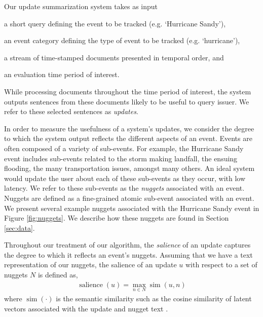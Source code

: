 \label{sec:methods}

Our update summarization system takes as input 
\begin{enumerate*}[label=\itshape\alph*\upshape)]
  \item a short query defining the event to be tracked (e.g. `Hurricane Sandy'), 
  \item an event category defining the type of event to be tracked (e.g. `hurricane'), 
  \item a stream of time-stamped documents %
  presented in temporal order, and \item an evaluation time period of interest.
\end{enumerate*} 
While processing documents
throughout the time period of interest, the system outputs sentences
from these documents likely to be useful to query issuer.  We refer
to these selected sentences as \emph{updates}.

In order to measure the usefulness of a system's updates, we consider
the degree to which the system output reflects the different
aspects of an event.  Events are often composed of a variety of sub-events.  
For example, the Hurricane Sandy
event includes sub-events related to the storm making landfall,
the ensuing flooding, the many transportation issues, amongst many
others.  An ideal system would update the user about each of these
sub-events as they occur, with low latency.  
We refer to these
sub-events as the \emph{nuggets} associated with an event.  Nuggets are
defined as a fine-grained atomic sub-event associated with an event.  
We present several example nuggets associated with the Hurricane
Sandy event 
in Figure \ref{fig:nuggets}.  
We describe how these 
nuggets are found in Section \ref{sec:data}.


%

Throughout our treatment of our algorithm, the \emph{salience} 
of an update captures the degree to which it reflects an 
event's nuggets.  Assuming that we have a text representation 
of our nuggets, the salience of an update $u$  with respect to a set of nuggets $N$ is
defined as,
\begin{align}
\operatorname{salience}(u) = \operatorname{max}_{n \in N} 
\operatorname{sim}(u, n) \label{eq:salience}
\end{align}
where $\operatorname{sim}(\cdot)$ is the semantic similarity such as
the cosine similarity of latent vectors associated with the update and 
nugget text \cite{guo2012simple}. 

